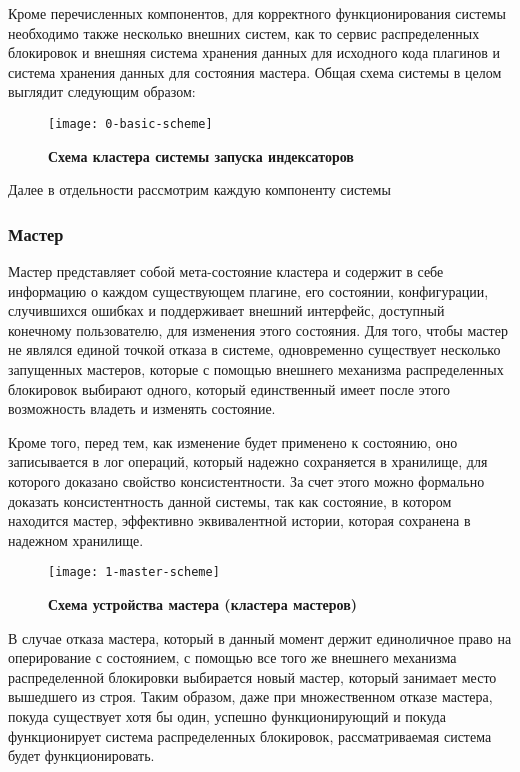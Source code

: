 Кроме перечисленных компонентов, для корректного функционирования системы необходимо также несколько внешних систем, как то сервис распределенных блокировок и внешняя система хранения данных для исходного кода плагинов и система хранения данных для состояния мастера. Общая схема системы в целом выглядит следующим образом:

\begin{figure}[h]
	\centering
	\caption{\textbf{Схема кластера системы запуска индексаторов}}
	
	\texttt{[image: 0-basic-scheme]}
\end{figure}

Далее в отдельности рассмотрим каждую компоненту системы

\subsubsection{Мастер}

Мастер представляет собой мета-состояние кластера и содержит в себе информацию о каждом существующем плагине, его состоянии, конфигурации, случившихся ошибках и поддерживает внешний интерфейс, доступный конечному пользователю, для изменения этого состояния. Для того, чтобы мастер не являлся единой точкой отказа в системе, одновременно существует несколько запущенных мастеров, которые с помощью внешнего механизма распределенных блокировок выбирают одного, который единственный имеет после этого возможность владеть и изменять состояние.

Кроме того, перед тем, как изменение будет применено к состоянию, оно записывается в лог операций, который надежно сохраняется в хранилище, для которого доказано свойство консистентности. За счет этого можно формально доказать консистентность данной системы, так как состояние, в котором находится мастер, эффективно эквивалентной истории, которая сохранена в надежном хранилище.

\begin{figure}[h]
	\centering
	\caption{\textbf{Схема устройства мастера (кластера мастеров)}}
	
	\texttt{[image: 1-master-scheme]}
\end{figure}

В случае отказа мастера, который в данный момент держит единоличное право на оперирование с состоянием, с помощью все того же внешнего механизма распределенной блокировки выбирается новый мастер, который занимает место вышедшего из строя. Таким образом, даже при множественном отказе мастера, покуда существует хотя бы один, успешно функционирующий и покуда функционирует система распределенных блокировок, рассматриваемая система будет функционировать.

